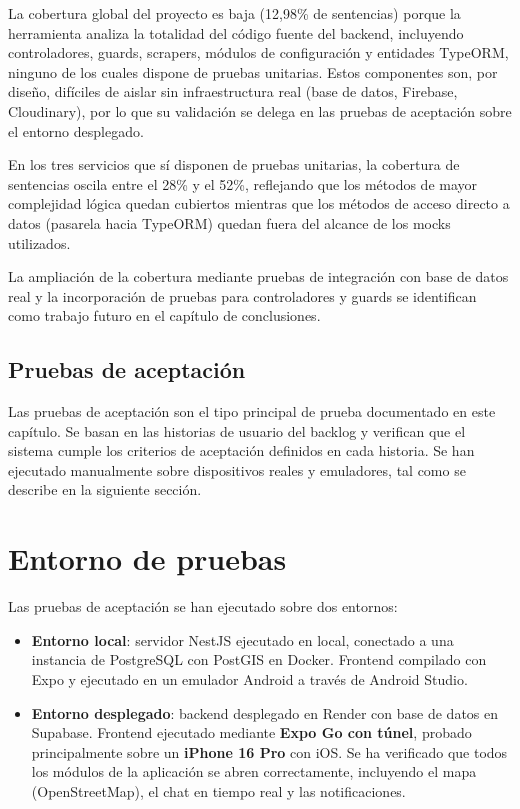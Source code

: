 La cobertura global del proyecto es baja (12,98\% de sentencias) porque la herramienta analiza la totalidad del código fuente del backend, incluyendo controladores, guards, scrapers, módulos de configuración y entidades TypeORM, ninguno de los cuales dispone de pruebas unitarias. Estos componentes son, por diseño, difíciles de aislar sin infraestructura real (base de datos, Firebase, Cloudinary), por lo que su validación se delega en las pruebas de aceptación sobre el entorno desplegado.

En los tres servicios que sí disponen de pruebas unitarias, la cobertura de sentencias oscila entre el 28\% y el 52\%, reflejando que los métodos de mayor complejidad lógica quedan cubiertos mientras que los métodos de acceso directo a datos (pasarela hacia TypeORM) quedan fuera del alcance de los mocks utilizados.

La ampliación de la cobertura mediante pruebas de integración con base de datos real y la incorporación de pruebas para controladores y guards se identifican como trabajo futuro en el capítulo de conclusiones.

\subsection{Pruebas de aceptación}

Las pruebas de aceptación son el tipo principal de prueba documentado en este capítulo. Se basan en las historias de usuario del backlog y verifican que el sistema cumple los criterios de aceptación definidos en cada historia. Se han ejecutado manualmente sobre dispositivos reales y emuladores, tal como se describe en la siguiente sección.

\section{Entorno de pruebas}

Las pruebas de aceptación se han ejecutado sobre dos entornos:

\begin{itemize}
    \item \textbf{Entorno local}: servidor NestJS ejecutado en local, conectado a una instancia de PostgreSQL con PostGIS en Docker. Frontend compilado con Expo y ejecutado en un emulador Android a través de Android Studio.

    \item \textbf{Entorno desplegado}: backend desplegado en Render con base de datos en Supabase. Frontend ejecutado mediante \textbf{Expo Go con túnel}, probado principalmente sobre un \textbf{iPhone 16 Pro} con iOS. Se ha verificado que todos los módulos de la aplicación se abren correctamente, incluyendo el mapa (OpenStreetMap), el chat en tiempo real y las notificaciones.
\end{itemize}


